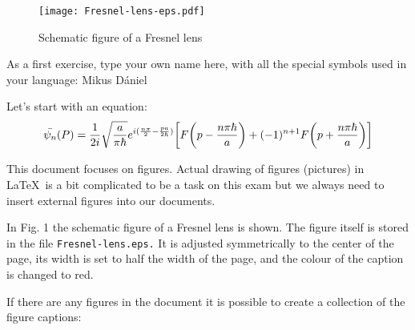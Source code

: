 \documentclass[12pt]{article}
\begin{document}
\begin{figure}
    \centering
    \texttt{[image: Fresnel-lens-eps.pdf]}
    \caption{\color{red}Schematic figure of a Fresnel lens}
    \label{fig:my_label}
\end{figure}
As a first exercise, type your own name here, with all the special symbols used in your language: Mikus Dániel \par
Let's start with an equation:
\begin{equation}
    \Bar{\psi _n} (P) = \frac{1}{2i} \sqrt{\frac{a}{\pi \hbar}} e^{i(\frac{n \pi}{2} - \frac{pa}{2 \hbar})} \bigg[ F \bigg(p - \frac{n \pi \hbar}{a}\bigg) + (-1)^{n+1} F \bigg(p + \frac{n \pi \hbar}{a}\bigg) \bigg]
\end{equation}
\par
This document focuses on figures. Actual drawing of figures (pictures) in \LaTeX ~is a bit complicated to be a task on this exam but we always need to insert external figures into our documents.\par
In Fig. 1 the schematic figure of a Fresnel lens is shown. The figure itself is stored in the file \verb|Fresnel-lens.eps.| It is adjusted symmetrically to the center of the page, its width is set to half the width of the page, and the colour of the caption is changed to red. \par
If there are any figures in the document it is possible to create a collection of the figure captions:
\listoffigures
\end{document}

